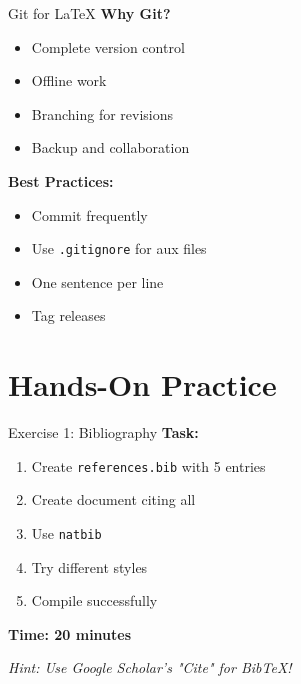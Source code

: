 \documentclass[aspectratio=169]{beamer}
\begin{document}
	\begin{frame}{Git for LaTeX}
		\textbf{Why Git?}
		\begin{itemize}
			\item Complete version control
			\item Offline work
			\item Branching for revisions
			\item Backup and collaboration
		\end{itemize}
		
		\vspace{1em}
		
		\textbf{Best Practices:}
		\begin{itemize}
			\item Commit frequently
			\item Use \texttt{.gitignore} for aux files
			\item One sentence per line
			\item Tag releases
		\end{itemize}
	\end{frame}
	
	\section{Hands-On Practice}
	
	\begin{frame}{Exercise 1: Bibliography}
		\textbf{Task:}
		\begin{enumerate}
			\item Create \texttt{references.bib} with 5 entries
			\item Create document citing all
			\item Use \texttt{natbib}
			\item Try different styles
			\item Compile successfully
		\end{enumerate}
		
		\vspace{1em}
		\textbf{Time: 20 minutes}
		
		\vspace{0.5em}
		\textit{Hint: Use Google Scholar's "Cite" for BibTeX!}
	\end{frame}
	
\end{document}
